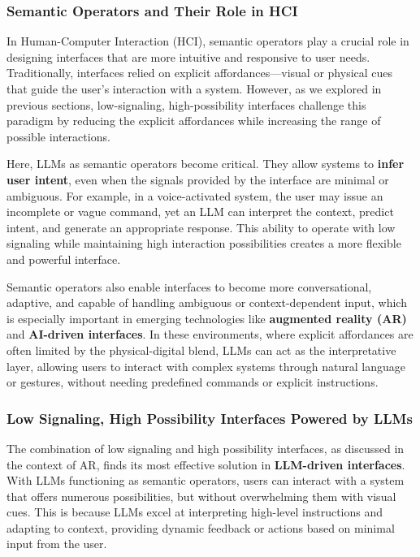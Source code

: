 \subsubsection{ Semantic Operators and Their Role in HCI}

In Human-Computer Interaction (HCI), semantic operators play a crucial role in designing interfaces that are more intuitive and responsive to user needs.
Traditionally, interfaces relied on explicit affordances—visual or physical cues that guide the user’s interaction with a system.
However, as we explored in previous sections, low-signaling, high-possibility interfaces challenge this paradigm by reducing the explicit affordances while increasing the range of possible interactions.

Here, LLMs as semantic operators become critical.
They allow systems to \textbf{infer user intent}, even when the signals provided by the interface are minimal or ambiguous.
For example, in a voice-activated system, the user may issue an incomplete or vague command, yet an LLM can interpret the context, predict intent, and generate an appropriate response.
This ability to operate with low signaling while maintaining high interaction possibilities creates a more flexible and powerful interface.

Semantic operators also enable interfaces to become more conversational, adaptive, and capable of handling ambiguous or context-dependent input, which is especially important in emerging technologies like \textbf{augmented reality (AR)} and \textbf{AI-driven interfaces}.
In these environments, where explicit affordances are often limited by the physical-digital blend, LLMs can act as the interpretative layer, allowing users to interact with complex systems through natural language or gestures, without needing predefined commands or explicit instructions.

\subsubsection{ Low Signaling, High Possibility Interfaces Powered by LLMs}

The combination of low signaling and high possibility interfaces, as discussed in the context of AR, finds its most effective solution in \textbf{LLM-driven interfaces}.
With LLMs functioning as semantic operators, users can interact with a system that offers numerous possibilities, but without overwhelming them with visual cues.
This is because LLMs excel at interpreting high-level instructions and adapting to context, providing dynamic feedback or actions based on minimal input from the user.

